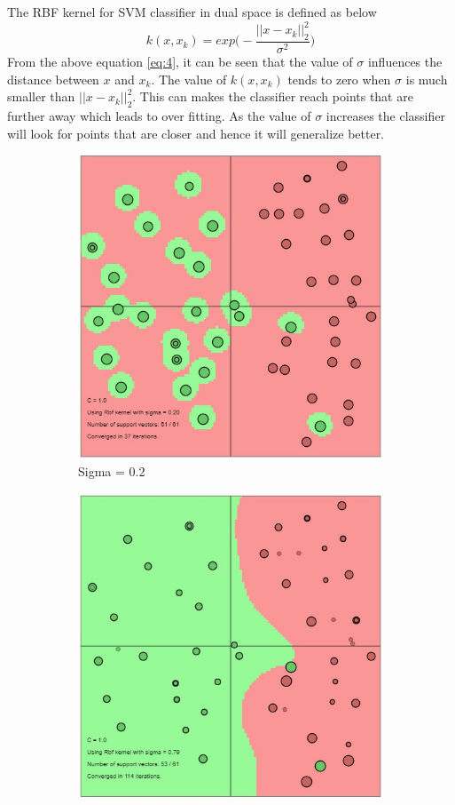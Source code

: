 \documentclass[12pt]{report}
\begin{document}
{The RBF kernel for SVM classifier in dual space is defined as below
\begin{equation}\label{eq:4}
	k(x,x_k)= exp\Bigg(-\dfrac{||x-x_k||^2_2}{\sigma^2} \Bigg)
\end{equation}
From the above equation \ref{eq:4}, it can be seen that the value of $\sigma$ influences the distance between $x$ and $x_k$. The value of $k(x,x_k)$ tends to zero when $\sigma$ is much smaller than $||x-x_k||^2_2$. This can makes the classifier reach points that are further away which leads to over fitting. As the value of $\sigma$ increases the classifier will look for points that are closer and hence it will generalize better.\\
\begin{figure}[!ht] 
	\centering
	\begin{subfigure}{.255\textwidth}
		\centering
		\includegraphics[width=0.8\linewidth]{RBF_sigma(0.2).jpg}
		\caption{Sigma = 0.2}
		\label{fig:RBF_sig0.2}
	\end{subfigure}%
	\begin{subfigure}{.255\textwidth}
		\centering
		\includegraphics[width=0.8\linewidth]{RBF_sigma(0.79).jpg}

\end{subfigure}
\end{figure}}
\end{document}
